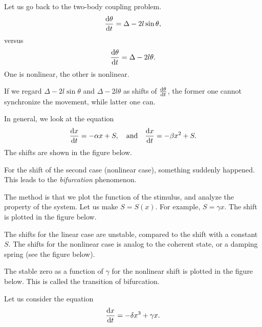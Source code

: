 Let us go back to the two-body coupling problem. 
\begin{align}
\frac{{\mathrm d} {\theta}}{{\mathrm d}t}= \Delta -2l \sin \theta,
\end{align}
versus
\begin{align}
\frac{{\mathrm d} {\theta}}{{\mathrm d}t}= \Delta -2l \theta.
\end{align}
One is nonlinear, the other is nonlinear. 

If we regard $ \Delta-2l\sin \theta $ and $ \Delta-2l \theta $ as shifts of $ \frac{{\mathrm d} {\theta}}{{\mathrm d}t} $, the former one cannot synchronize the movement, while latter one can. 

In general, we look at the equation
\begin{align}
\frac{{\mathrm d} {x }}{{\mathrm d}t}= -\alpha x+S,\quad \textrm{and} \quad \frac{{\mathrm d} {x}}{{\mathrm d}t}=-\beta x^2+S.
\end{align}
The shifts are shown in the figure below. 


For the shift of the second case (nonlinear case), something suddenly happened. This leads to the \textit{bifurcation} phenomenon. 

The method is that we plot the function of the stimulus, and analyze the property of the system. Let us make $ S=S(x) $. For example, $ S=\gamma x $. The shift is plotted in the figure below. 


The shifts for the linear case are unstable, compared to the shift with a constant $ S $. The shifts for the nonlinear case is analog to the coherent state, or a damping spring (see the figure below). 


The stable zero as a function of $ \gamma $ for the nonlinear shift is plotted in the figure below. This is called the transition of bifurcation. 


Let us consider the equation
\begin{align}
\frac{{\mathrm d} {x}}{{\mathrm d}t}=-\delta x^3 + \gamma x.
\end{align}

